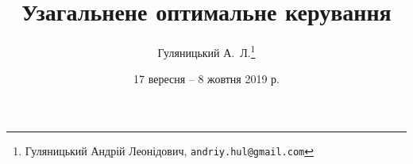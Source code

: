 
\usepackage[explicit]{hulianytskyi}

\title{Узагальнене оптимальне керування}
\author{Гуляницький А.~Л.\footnote{Гуляницький Андрій Леонідович, \texttt{andriy.hul@gmail.com}}}
\date{17 вересня -- 8 жовтня 2019 р.}
\maketitle
\tableofcontents
\thispagestyle{empty}





